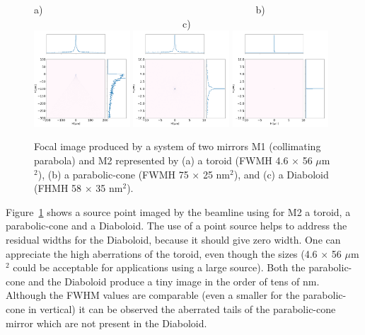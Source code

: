 \documentclass[a4paper, 11pt]{article}
\begin{document}
\begin{figure}[h]
\flushleft
a)~~~~~~~~~~~~~~~~~~~~~~~~~~~~~~~~~~~~~~~~~~~b)~~~~~~~~~~~~~~~~~~~~~~~~~~~~~~~~~~~~~~~~~~~c)\\
\centering
\includegraphics[width=0.32\textwidth]{figures/bl_point_toroid.png}
\includegraphics[width=0.32\textwidth]{figures/bl_point_parabolic-cone.png}
\includegraphics[width=0.32\textwidth]{figures/bl_point_diaboloid.png}
\caption{\label{fig:bl}Focal image produced by a system of two mirrors M1 (collimating parabola) and M2 represented by (a) a toroid (FWMH 4.6 $\times$ 56 $\mu$m$^2$), (b) a parabolic-cone (FWMH 75 $\times$ 25 nm$^2$), and (c) a Diaboloid (FHMH 58 $\times$ 35 nm$^2$).
}
\end{figure}

Figure~\ref{fig:bl} shows a source point imaged by the beamline using for M2 a toroid, a parabolic-cone and a Diaboloid. The use of a point source helps to address the residual widths for the Diaboloid, because it should give zero width. One can appreciate the high aberrations of the toroid, even though the sizes (4.6 $\times$ 56 $\mu$m$^2$ could be acceptable for applications using a large source). Both the parabolic-cone and the Diaboloid produce a tiny image in the order of tens of nm. Although the FWHM values are comparable (even a smaller for the parabolic-cone in vertical) it can be observed the aberrated tails of the parabolic-cone mirror which are not present in the Diaboloid. 
\end{document}
